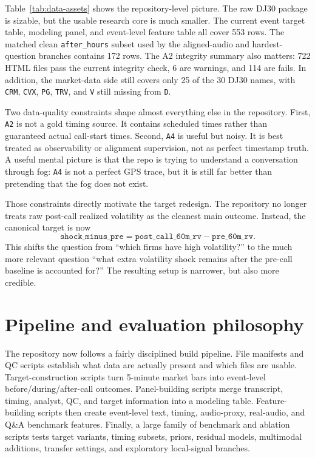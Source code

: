 \documentclass[acmsmall,screen,nonacm]{acmart}
\begin{document}
Table~\ref{tab:data-assets} shows the repository-level picture. The raw DJ30 package is sizable, but the usable research core is much smaller. The current event target table, modeling panel, and event-level feature table all cover 553 rows. The matched clean \texttt{after\_hours} subset used by the aligned-audio and hardest-question branches contains 172 rows. The A2 integrity summary also matters: 722 HTML files pass the current integrity check, 6 are warnings, and 114 are fails. In addition, the market-data side still covers only 25 of the 30 DJ30 names, with \texttt{CRM}, \texttt{CVX}, \texttt{PG}, \texttt{TRV}, and \texttt{V} still missing from \texttt{D}.

Two data-quality constraints shape almost everything else in the repository. First, \texttt{A2} is not a gold timing source. It contains scheduled times rather than guaranteed actual call-start times. Second, \texttt{A4} is useful but noisy. It is best treated as observability or alignment supervision, not as perfect timestamp truth. A useful mental picture is that the repo is trying to understand a conversation through fog: \texttt{A4} is not a perfect GPS trace, but it is still far better than pretending that the fog does not exist.

Those constraints directly motivate the target redesign. The repository no longer treats raw post-call realized volatility as the cleanest main outcome. Instead, the canonical target is now
\begin{equation}
\texttt{shock\_minus\_pre} = \texttt{post\_call\_60m\_rv} - \texttt{pre\_60m\_rv}.
\end{equation}
This shifts the question from ``which firms have high volatility?'' to the much more relevant question ``what extra volatility shock remains after the pre-call baseline is accounted for?'' The resulting setup is narrower, but also more credible.

\section{Pipeline and evaluation philosophy}
The repository now follows a fairly disciplined build pipeline. File manifests and QC scripts establish what data are actually present and which files are usable. Target-construction scripts turn 5-minute market bars into event-level before/during/after-call outcomes. Panel-building scripts merge transcript, timing, analyst, QC, and target information into a modeling table. Feature-building scripts then create event-level text, timing, audio-proxy, real-audio, and Q\&A benchmark features. Finally, a large family of benchmark and ablation scripts tests target variants, timing subsets, priors, residual models, multimodal additions, transfer settings, and exploratory local-signal branches.
\end{document}
